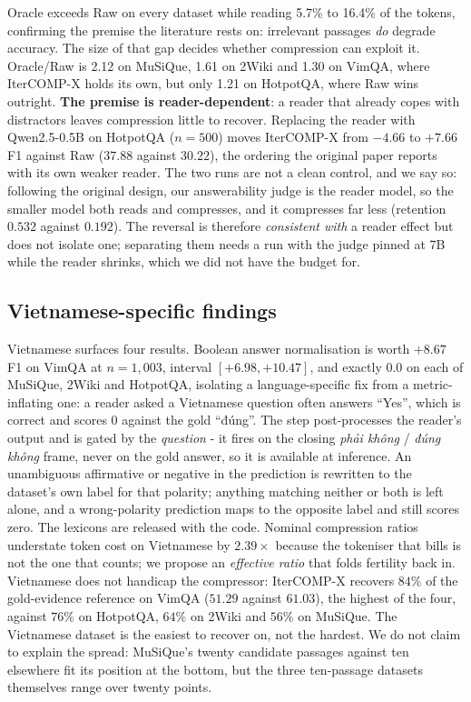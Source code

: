 \documentclass{llncs}
\begin{document}
Oracle exceeds Raw on every dataset while reading 5.7\% to 16.4\% of the tokens,
confirming the premise the literature rests on: irrelevant passages \emph{do}
degrade accuracy. The size of that gap decides whether compression can exploit it. Oracle/Raw is 2.12 on MuSiQue, 1.61 on 2Wiki and 1.30 on VimQA, where IterCOMP-X
holds its own, but only 1.21 on HotpotQA, where Raw wins outright. \textbf{The premise is
reader-dependent}: a reader that already copes with distractors leaves compression
little to recover. Replacing the reader with Qwen2.5-0.5B on HotpotQA ($n=500$)
moves IterCOMP-X from $-4.66$ to $+7.66$ F1 against Raw ($37.88$ against
$30.22$), the ordering the original paper reports with its own weaker reader.
The two runs are not a clean control, and we say so: following the original
design, our answerability judge is the reader model, so the smaller model both
reads and compresses, and it compresses far less (retention $0.532$ against
$0.192$). The reversal is therefore \emph{consistent with} a reader effect but
does not isolate one; separating them needs a run with the judge pinned at 7B
while the reader shrinks, which we did not have the budget for.

\subsection{Vietnamese-specific findings}
\label{sec:vnfindings}
Vietnamese surfaces four results. Boolean answer
normalisation is worth $+8.67$ F1 on VimQA at $n=1{,}003$, interval
$[+6.98,+10.47]$, and exactly $0.0$ on each of MuSiQue, 2Wiki and HotpotQA,
isolating a language-specific fix from a metric-inflating
one: a reader asked a Vietnamese question often answers ``Yes'', which is
correct and scores $0$ against the gold ``đúng''. The step post-processes the reader's output and is
gated by the \emph{question} - it fires on the closing \emph{phải không} /
\emph{đúng không} frame, never on the gold answer, so it is available at
inference. An unambiguous affirmative or negative in the prediction is rewritten
to the dataset's own label for that polarity; anything matching neither or both
is left alone, and a wrong-polarity prediction maps to the opposite label and
still scores zero. The lexicons are released with the code. Nominal compression ratios understate token cost
on Vietnamese by $2.39\times$ because the tokeniser that bills is not the one
that counts; we propose an \emph{effective ratio} that folds fertility back in. Vietnamese does not handicap the compressor:
IterCOMP-X recovers $84\%$ of the gold-evidence reference on VimQA ($51.29$
against $61.03$), the highest of the four, against $76\%$ on HotpotQA, $64\%$ on
2Wiki and $56\%$ on MuSiQue. The Vietnamese dataset is the easiest to recover on,
not the hardest. We do not claim to explain the spread: MuSiQue's twenty
candidate passages against ten elsewhere fit its position at the bottom, but the
three ten-passage datasets themselves range over twenty points.
\end{document}

